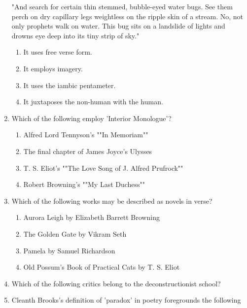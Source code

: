 \documentclass[12pt]{article}
\theoremstyle{remark}
\begin{document}
\begin{enumerate}
"And search
for certain thin
stemmed, bubble-eyed water bugs.
See them perch
on dry capillary legs
weightless
on the ripple skin
of a stream.
No, not only prophets
walk on water. This bug sits
on a landslide of lights
and drowns eye
deep
into its tiny strip
of sky." 
\begin{enumerate}
\item It uses free verse form. 
\item It employs imagery. 
\item It uses the iambic pentameter. 
\item It juxtaposes the non-human with the human. 
\end{enumerate}
\hfill{}
\item Which of the following employ 'Interior Monologue'? 
\begin{enumerate} 
\item Alfred Lord Tennyson's ""In Memoriam"" 
\item The final chapter of James Joyce's Ulysses 
\item T. S. Eliot's ""The Love Song of J. Alfred Prufrock"" 
\item Robert Browning's ""My Last Duchess"" 
\end{enumerate}
\hfill{}
\item Which of the following works may be described as novels in verse? 
\begin{enumerate} 
\item Aurora Leigh by Elizabeth Barrett Browning 
\item The Golden Gate by Vikram Seth 
\item Pamela by Samuel Richardson 
\item Old Possum's Book of Practical Cats by T. S. Eliot 
\end{enumerate}
\hfill{}
\item Which of the following critics belong to the deconstructionist school? 
\begin{enumerate}  \end{enumerate}
\hfill{}
\item Cleanth Brooks's definition of 'paradox' in poetry foregrounds the following

\end{enumerate}
\end{document}

